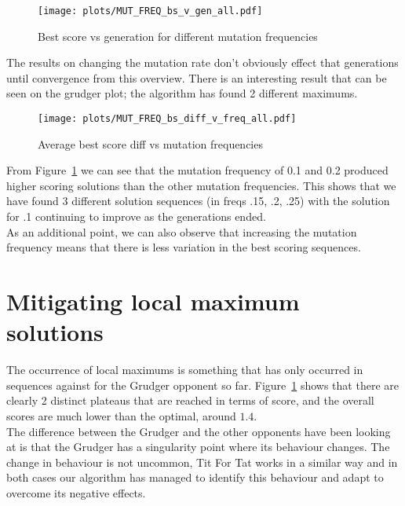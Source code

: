 \begin{figure}[h]
    \texttt{[image: plots/MUT\_FREQ\_bs\_v\_gen\_all.pdf]}
    \caption{Best score vs generation for different mutation frequencies}\label{fig:MUT-FREQ-bs-v-gen-all}
\end{figure}

The results on changing the mutation rate don't obviously effect that generations until convergence from this overview.
There is an interesting result that can be seen on the grudger plot;
the algorithm has found 2 different maximums.

\begin{figure}[h]
    \texttt{[image: plots/MUT\_FREQ\_bs\_diff\_v\_freq\_all.pdf]}
    \caption{Average best score diff vs mutation frequencies}\label{fig:MUT-FREQ-bs-diff-v-freq-all}
\end{figure}

From Figure~\ref{fig:MUT-FREQ-bs-v-gen-all} we can see that the mutation frequency of 0.1 and 0.2 produced higher scoring solutions than the other mutation frequencies.
This shows that we have found 3 different solution sequences (in freqs .15, .2, .25) with the solution for .1 continuing to improve as the generations ended.\\

As an additional point, we can also observe that increasing the mutation frequency means that there is less variation in the best scoring sequences.

\section{Mitigating local maximum solutions}\label{sec:mitigatingLocalMaximums}
The occurrence of local maximums is something that has only occurred in sequences against for the Grudger opponent so far.
Figure~\ref{fig:MUT-FREQ-bs-v-gen-all} shows that there are clearly 2 distinct plateaus that are reached in terms of score, and the overall scores are much lower than the optimal, around \(1.4\). \\

The difference between the Grudger and the other opponents have been looking at is that the Grudger has a singularity point where its behaviour changes.
The change in behaviour is not uncommon, Tit For Tat works in a similar way and in both cases our algorithm has managed to identify this behaviour and adapt to overcome its negative effects.\\

